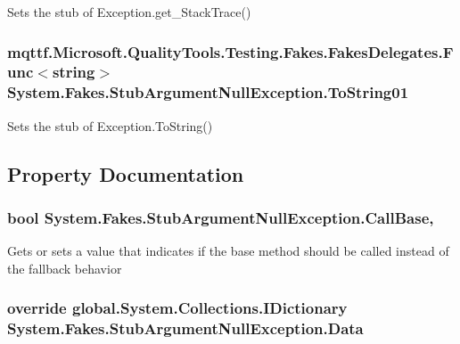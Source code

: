 Sets the stub of Exception.\-get\-\_\-\-Stack\-Trace()

\hypertarget{class_system_1_1_fakes_1_1_stub_argument_null_exception_a3f888d0a93041e6c6294e377c8cb6908}{
\subsubsection[{To\-String01}]{\setlength{\rightskip}{0pt plus 5cm}mqttf.\-Microsoft.\-Quality\-Tools.\-Testing.\-Fakes.\-Fakes\-Delegates.\-Func$<$string$>$ System.\-Fakes.\-Stub\-Argument\-Null\-Exception.\-To\-String01}}\label{class_system_1_1_fakes_1_1_stub_argument_null_exception_a3f888d0a93041e6c6294e377c8cb6908}


Sets the stub of Exception.\-To\-String()



\subsection{Property Documentation}
\hypertarget{class_system_1_1_fakes_1_1_stub_argument_null_exception_a48207375fedc9a7bbed5575c9d883fb9}{
\subsubsection[{Call\-Base}]{\setlength{\rightskip}{0pt plus 5cm}bool System.\-Fakes.\-Stub\-Argument\-Null\-Exception.\-Call\-Base\hspace{0.3cm}{\ttfamily [get]}, {\ttfamily [set]}}}\label{class_system_1_1_fakes_1_1_stub_argument_null_exception_a48207375fedc9a7bbed5575c9d883fb9}


Gets or sets a value that indicates if the base method should be called instead of the fallback behavior

\hypertarget{class_system_1_1_fakes_1_1_stub_argument_null_exception_a4626d75e05c0326c081896c9db4423d6}{
\subsubsection[{Data}]{\setlength{\rightskip}{0pt plus 5cm}override global.\-System.\-Collections.\-I\-Dictionary System.\-Fakes.\-Stub\-Argument\-Null\-Exception.\-Data\hspace{0.3cm}{\ttfamily [get]}}}\label{class_system_1_1_fakes_1_1_stub_argument_null_exception_a4626d75e05c0326c081896c9db4423d6}


